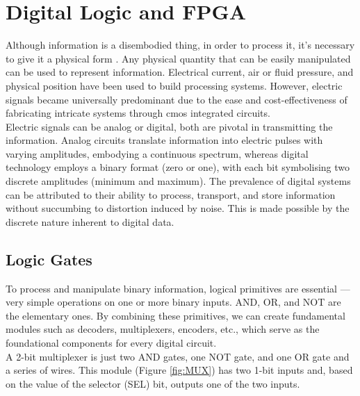 \chapter{Digital Logic and FPGA}
\label{ch2}
Although information is a disembodied thing, in order to process it, it’s necessary to give it a physical form \cite{CarverMead}. Any physical quantity that can be easily manipulated can be used to represent information. Electrical current, air or fluid pressure, and physical position have been used to build processing systems. However, electric signals became universally predominant due to the ease and cost-effectiveness of fabricating intricate systems through \acrfull{cmos} integrated circuits.\\
Electric signals can be analog or digital, both are pivotal in transmitting the information. Analog circuits translate information into electric pulses with varying amplitudes, embodying a continuous spectrum, whereas digital technology employs a binary format (zero or one), with each bit symbolising two discrete amplitudes (minimum and maximum). The prevalence of digital systems can be attributed to their ability to process, transport, and store information without succumbing to distortion induced by noise. This is made possible by the discrete nature inherent to digital data.\\

\section{Logic Gates}
To process and manipulate binary information, logical primitives are essential — very simple operations on one or more binary inputs. AND, OR, and NOT are the elementary ones. By combining these primitives, we can create fundamental modules such as decoders, multiplexers, encoders, etc., which serve as the foundational components for every digital circuit.\\
A 2-bit multiplexer is just two AND gates, one NOT gate, and one OR gate and a series of wires. This module (Figure \ref{fig:MUX}) has two 1-bit inputs and, based on the value of the selector (SEL) bit, outputs one of the two inputs.\\

